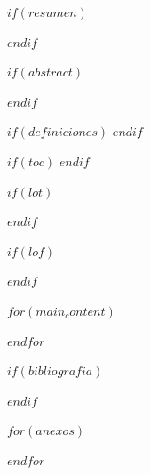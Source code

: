 \documentclass[$if(fontsize)$$fontsize$,$endif$$if(lang)$$lang$,$endif$$if(papersize)$$papersize$,$endif$$for(classoption)$$classoption$$sep$,$endfor$]{$documentclass$}
\renewenvironment{abstract}{
    \newpage
    \null\vfil
    \begin{center}%
        \bfseries \abstractname
    \end{center}
}
{\par\vfil\null\cleardoublepage}
\let\cleardoublepage\clearpage
\begin{document}
    $if(resumen)$
        \begin{abstract}
            
        \end{abstract}
        \pagebreak
    $endif$

    $if(abstract)$
        \begin{english}
            \begin{abstract}
                
            \end{abstract}
        \end{english}
        \pagebreak
    $endif$

    $if(definiciones)$
        \printglossary
        \pagebreak
    $endif$

    $if(toc)$
        {
            \hypersetup{linkcolor=black}
            \setcounter{tocdepth}{$toc-depth$}
            \tableofcontents
        }
    $endif$

    $if(lot)$
        \listoftables
    $endif$

    $if(lof)$
        \listoffigures
    $endif$
    \pagebreak


    $for(main_content)$
        
        \pagebreak
    $endfor$

    $if(bibliografia)$
        
        \pagebreak
    $endif$

    $for(anexos)$
        
    $endfor$
\end{document}
